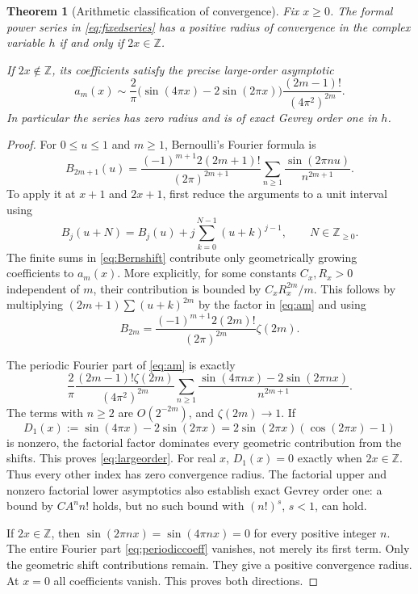 \documentclass[11pt,a4paper]{article}
\numberwithin{equation}{section}
\newtheorem{theorem}{Theorem}[section]
\theoremstyle{definition}
\newcommand{\Z}{\mathbb Z}
\begin{document}
\begin{theorem}[Arithmetic classification of convergence]
\label{thm:classification}
Fix $x\ge0$. The formal power series in \eqref{eq:fixedseries} has a positive radius of convergence in the complex variable $h$ if and only if $2x\in\Z$.

If $2x\notin\Z$, its coefficients satisfy the precise large-order asymptotic
\begin{equation}
\boxed{\displaystyle
a_m(x)\sim\frac2\pi\bigl(\sin(4\pi x)-2\sin(2\pi x)\bigr)
              \frac{(2m-1)!}{(4\pi^2)^{2m}}.}
\label{eq:largeorder}
\end{equation}
In particular the series has zero radius and is of exact Gevrey order one in $h$.
\end{theorem}
\begin{proof}
For $0\le u\le1$ and $m\ge1$, Bernoulli's Fourier formula is \cite{dlmfbern}
\begin{equation}
B_{2m+1}(u)=
\frac{(-1)^{m+1}2(2m+1)!}{(2\pi)^{2m+1}}
\sum_{n\ge1}\frac{\sin(2\pi nu)}{n^{2m+1}}.
\label{eq:BernFourier}
\end{equation}
To apply it at $x+1$ and $2x+1$, first reduce the arguments to a unit interval using
\begin{equation}
B_j(u+N)=B_j(u)+j\sum_{k=0}^{N-1}(u+k)^{j-1},
\qquad N\in\Z_{\ge0}.
\label{eq:Bernshift}
\end{equation}
The finite sums in \eqref{eq:Bernshift} contribute only geometrically growing coefficients to $a_m(x)$. More explicitly, for some constants $C_x,R_x>0$ independent of $m$, their contribution is bounded by
$C_xR_x^{2m}/m$. This follows by multiplying $(2m+1)\sum(u+k)^{2m}$ by the factor in \eqref{eq:am} and using
\[
B_{2m}=\frac{(-1)^{m+1}2(2m)!}{(2\pi)^{2m}}\zeta(2m).
\]

The periodic Fourier part of \eqref{eq:am} is exactly
\begin{equation}
\frac2\pi\frac{(2m-1)!\zeta(2m)}{(4\pi^2)^{2m}}
\sum_{n\ge1}\frac{\sin(4\pi nx)-2\sin(2\pi nx)}{n^{2m+1}}.
\label{eq:periodiccoeff}
\end{equation}
The terms with $n\ge2$ are $O(2^{-2m})$, and $\zeta(2m)\to1$. If
\[
D_1(x):=\sin(4\pi x)-2\sin(2\pi x)
       =2\sin(2\pi x)(\cos(2\pi x)-1)
\]
is nonzero, the factorial factor dominates every geometric contribution from the shifts. This proves \eqref{eq:largeorder}. For real $x$, $D_1(x)=0$ exactly when $2x\in\Z$. Thus every other index has zero convergence radius. The factorial upper and nonzero factorial lower asymptotics also establish exact Gevrey order one: a bound by $C A^n n!$ holds, but no such bound with $(n!)^s$, $s<1$, can hold.

If $2x\in\Z$, then $\sin(2\pi nx)=\sin(4\pi nx)=0$ for every positive integer $n$. The entire Fourier part \eqref{eq:periodiccoeff} vanishes, not merely its first term. Only the geometric shift contributions remain. They give a positive convergence radius. At $x=0$ all coefficients vanish. This proves both directions.
\end{proof}
\end{document}
